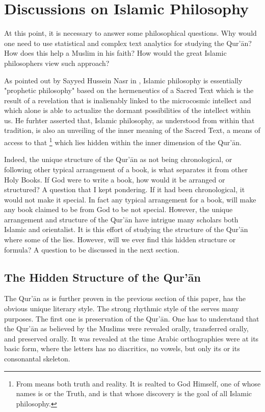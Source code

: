 \section{Discussions on Islamic Philosophy}\label{sec:result_islamic_philosophy}
At this point, it is necessary to answer some philosophical questions. Why would one need to use statistical and complex text analytics for studying the Qur'\=an? How does this help a Muslim in his faith? How would the great Islamic philosophers view such approach?

As pointed out by Sayyed Hussein Nasr in \cite{nasr2013history}, Islamic philosophy is essentially "prophetic philosophy" based on the hermeneutics of a Sacred Text which is the result of a revelation that is inalienably linked to the microcosmic intellect and which alone is able to actualize the dormant possibilities of the intellect within us. He furhter asserted that, Islamic philosophy, as understood from within that tradition, is also an unveiling of the inner meaning of the Sacred Text, a means of access to that  \footnote{From \cite{nasr2013history}   means both truth and reality. It is realted to God Himself, one of whose names is   or the Truth, and is that whose discovery is the goal of all Islamic philosophy.} which lies hidden within the inner dimension of the Qur'\=an.

Indeed, the unique structure of the Qur'\=an as not being chronological, or following other typical arrangement of a book, is what separates it from other Holy Books. If God were to write a book, how would it be arranged or structured? A question that I kept pondering. If it had been chronological, it would not make it special. In fact any typical arrangement for a book, will make any book claimed to be from God to be not special. However, the unique arrangement and structure of the Qur'\=an have intrigue many scholars both Islamic and orientalist. It is this effort of studying the structure of the Qur'\=an where some of the   lies. However, will we ever find this hidden structure or formula? A question to be discussed in the next section.

\subsection{The Hidden Structure of the Qur'\=an}
The Qur'\=an as is further proven in the previous section of this paper, has the obvious unique literary style. The strong rhythmic style of the   serves many purposes. The first one is preservation of the Qur'\=an. One has to understand that the Qur'\=an as believed by the Muslims were revealed orally, transferred orally, and preserved orally. It was revealed at the time Arabic orthographies were at its basic form, where the letters has no diacritics, no vowels, but only its   or its consonantal skeleton. 


